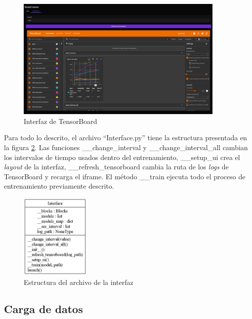 \begin{figure}[H]
    \centering
    \includegraphics[width=0.9\textwidth]{Imagenes/Bitmap/interfaz-tensorboard.png}
    \caption{Interfaz de TensorBoard}
    \label{fig:interfaz-tensorboard}
\end{figure}

Para todo lo descrito, el archivo ``Interface.py'' tiene la estructura presentada en la figura \ref{fig:interfaz-estructura}. Las funciones \_\_change\_interval y \_\_change\_interval\_all cambian los intervalos de tiempo usados dentro del entrenamiento, \_\_setup\_ui crea el \textit{layout} de la interfaz, \_\_refresh\_tensorboard cambia la ruta de los \textit{logs} de TensorBoard y recarga el \gls{iframe}. El método \_\_train ejecuta todo el proceso de entrenamiento previamente descrito.

\begin{figure}[H]
    \centering
    \includegraphics[width=0.3\textwidth]{Imagenes/Bitmap/classes_Interface.png}
    \caption{Estructura del archivo de la interfaz}
    \label{fig:interfaz-estructura}
\end{figure}

\subsection{Carga de datos}

